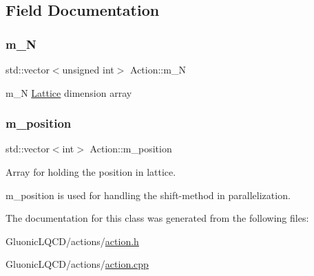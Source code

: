 \subsection{Field Documentation}
\mbox{\label{class_action_a80654d2311707f24689cd9e480edb2f6}} 
\subsubsection{\texorpdfstring{m\_N}{m\_N}}
{\footnotesize\ttfamily std\+::vector$<$unsigned int$>$ Action\+::m\+\_\+N\hspace{0.3cm}{\ttfamily [protected]}}



m\+\_\+N \mbox{\hyperlink{class_lattice}{Lattice}} dimension array 

\mbox{\label{class_action_a133fd17c83db233423855178bc81fb16}} 
\subsubsection{\texorpdfstring{m\_position}{m\_position}}
{\footnotesize\ttfamily std\+::vector$<$int$>$ Action\+::m\+\_\+position\hspace{0.3cm}{\ttfamily [protected]}}



Array for holding the position in lattice. 

m\+\_\+position is used for handling the shift-\/method in parallelization. 

The documentation for this class was generated from the following files\+:\begin{DoxyCompactItemize}
\item 
Gluonic\+L\+Q\+C\+D/actions/\mbox{\hyperlink{action_8h}{action.\+h}}\item 
Gluonic\+L\+Q\+C\+D/actions/\mbox{\hyperlink{action_8cpp}{action.\+cpp}}\end{DoxyCompactItemize}
